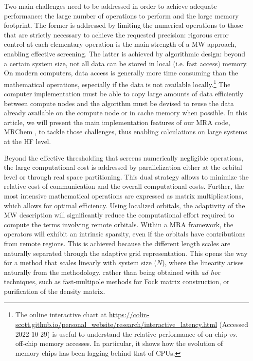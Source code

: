\documentclass[journal=jctcce, manuscript=article]{achemso}
\begin{document}
Two main challenges need to be addressed in order to achieve adequate performance: the large number of operations to perform and the large memory footprint. The former is addressed by limiting the numerical operations to those that are strictly necessary to achieve the requested precision: rigorous error control at each elementary operation is the main strength of a \ac{MW} approach, enabling effective screening. The latter is achieved by algorithmic design: beyond a certain system size, not all data can be stored in local (i.e. fast access) memory. 
On modern computers, data access is generally more time consuming than the mathematical operations, especially if the data is not available locally.\footnote{The online interactive chart at \url{https://colin-scott.github.io/personal_website/research/interactive_latency.html} (Accessed 2022-10-29) is useful to understand the relative performance of on-chip \emph{vs.} off-chip memory accesses. In particular, it shows how the evolution of memory chips has been lagging behind that of CPUs.} 
The computer implementation must be able to copy large amounts of data efficiently between compute nodes and the algorithm must be devised to reuse the data already available on the compute node or in cache memory when possible. In this article, we will present the main implementation features of our \ac{MRA} code, MRChem \cite{mrchem}, to tackle those challenges, thus enabling calculations on large systems at the \ac{HF} level.

Beyond the effective thresholding that screens numerically negligible operations, the large computational cost is addressed by parallelization either at the orbital level or through real space partitioning. This dual strategy allows to minimize the relative cost of communication and the overall computational costs. Further, the most intensive mathematical operations are expressed as matrix multiplications, which allows for optimal efficiency.  
Using localized orbitals, the adaptivity of the \ac{MW} description will significantly reduce the computational effort required to compute the terms involving remote orbitals. 
Within a \ac{MRA} framework, the operators will exhibit an intrinsic sparsity, even if the orbitals have contributions from remote regions. This is achieved because the different length scales are naturally separated through the adaptive grid representation.
This opens the way for a method that scales linearly with system size ($N$), where the linearity arises naturally from the methodology, rather than being obtained with \emph{ad hoc} techniques, such as fast-multipole methods \cite{GREENGARD1987325} for Fock matrix construction, or purification of the density matrix. \cite{Helgaker2000-yb}
\end{document}
